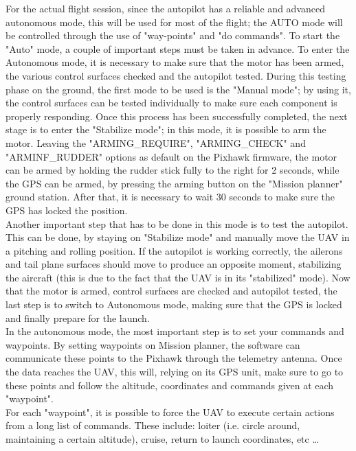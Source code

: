 \documentclass[12pt]{article}
\begin{document}
\noindent For the actual flight session, since the autopilot has a reliable and advanced autonomous mode, this will be used for most of the flight; the AUTO mode will be controlled through the use of "way-points" and "do commands". To start the "Auto" mode, a couple of important steps must be taken in advance. To enter the Autonomous mode, it is necessary to make sure that the motor has been armed, the various control surfaces checked and the autopilot tested. During this testing phase on the ground, the first mode to be used is the "Manual mode"; by using it, the control surfaces can be tested individually to make sure each component is properly responding. Once this process has been successfully completed, the next stage is to enter the "Stabilize mode"; in this mode, it is possible to arm the motor. Leaving the "ARMING\_REQUIRE", "ARMING\_CHECK" and "ARMINF\_RUDDER" options as default on the Pixhawk firmware, the motor can be armed by holding the rudder stick fully to the right for 2 seconds, while the GPS can be armed, by pressing the arming button on the "Mission planner" ground station. After that, it is necessary to wait 30 seconds to make sure the GPS has locked the position.\cite{CONTROL4} \\

\noindent Another important step that has to be done in this mode is to test the autopilot. This can be done, by staying on "Stabilize mode" and manually move the UAV in a pitching and rolling position. If the autopilot is working correctly, the ailerons and tail plane surfaces should move to produce an opposite moment, stabilizing the aircraft (this is due to the fact that the UAV is in its "stabilized" mode). Now that the motor is armed, control surfaces are checked and autopilot tested, the last step is to switch to Autonomous mode, making sure that the GPS is locked and finally prepare for the launch. \\

\noindent In the autonomous mode, the most important step is to set your commands and waypoints. By setting waypoints on Mission planner, the software can communicate these points to the Pixhawk through the telemetry antenna. Once the data reaches the UAV, this will, relying on its GPS unit, make sure to go to these points and follow the altitude, coordinates and commands given at each "waypoint". \cite{CONTROL3} \\

\noindent For each "waypoint", it is possible to force the UAV to execute certain actions from a long list of commands. These include: loiter (i.e. circle around, maintaining a certain altitude), cruise, return to launch coordinates, etc \ldots \cite{CONTROL3} \\
\end{document}
